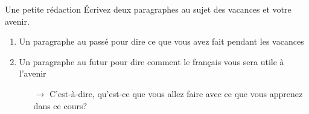\begin{frame}{Une petite rédaction}
  Écrivez deux paragraphes au sujet des vacances et votre avenir.
  \begin{enumerate}
    \item Un paragraphe \alert{au passé} pour dire ce que vous avez fait pendant les vacances
    \item Un paragraphe \alert{au futur} pour dire comment le français vous sera utile à l'avenir
    \begin{itemize}
      \item[$\to$] C'est-à-dire, qu'est-ce que vous allez faire avec ce que vous apprenez dans ce cours?
    \end{itemize}
  \end{enumerate}
\end{frame}